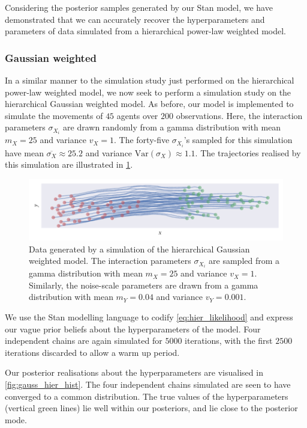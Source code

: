 Considering the posterior samples generated by our Stan model, we have
demonstrated that we can accurately recover the hyperparameters and parameters
of data simulated from a hierarchical power-law weighted model.

\subsubsection{Gaussian weighted}

In a similar manner to the simulation study just performed on the hierarchical
power-law weighted model, we now seek to perform a simulation study on the
hierarchical Gaussian weighted model. As before, our model is implemented to
simulate the movements of $45$ agents over $200$ observations. Here, the
interaction parameters $\sigma_{X_i}$ are drawn randomly from a gamma
distribution with mean $m_X=25$ and variance $v_X=1$. The forty-five
$\sigma_{X_i}$'s sampled for this simulation have mean
$\overline{\sigma_X}\approx25.2$ and variance $\text{Var}(\sigma_X)\approx1.1$.
The trajectories realised by this simulation are illustrated in
\cref{fig:gauss_hier_sim}.

\begin{figure}[tbp]
  \includegraphics{gauss_hier_sim.pdf}
  \caption{Data generated by a simulation of the hierarchical Gaussian weighted
    model. The interaction parameters $\sigma_{X_i}$ are sampled from a gamma
    distribution with mean $m_X=25$ and variance $v_X=1$. Similarly, the
    noise-scale parameters are drawn from a gamma distribution with mean
    $m_Y=0.04$ and variance $v_Y=0.001$.} 
  \label{fig:gauss_hier_sim}
\end{figure}

We use the Stan modelling language to codify \cref{eq:hier_likelihood} and
express our vague prior beliefs about the hyperparameters of the model. Four
independent chains are again simulated for $5000$ iterations, with the first
$2500$ iterations discarded to allow a warm up period.

Our posterior realisations about the hyperparameters are visualised in
\cref{fig:gauss_hier_hist}. The four independent chains simulated are seen to
have converged to a common distribution. The true values of the hyperparameters
(vertical green lines) lie well within our posteriors, and lie close to
the posterior mode.

